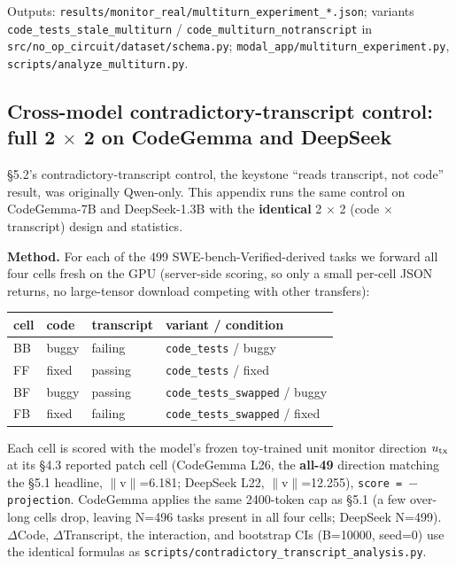 \documentclass[
  11pt,
  a4paper]{article}
\newcounter{none} %
\begin{document}
Outputs: \texttt{results/monitor\_real/multiturn\_experiment\_*.json};
variants \texttt{code\_tests\_stale\_multiturn} /
\texttt{code\_multiturn\_notranscript} in
\texttt{src/no\_op\_circuit/dataset/schema.py};
\texttt{modal\_app/multiturn\_experiment.py},
\texttt{scripts/analyze\_multiturn.py}.

\subsection{Cross-model contradictory-transcript control: full 2 \ensuremath{\times} 2 on
CodeGemma and
DeepSeek}\label{cross-model-contradictory-transcript-control-full-2-2-on-codegemma-and-deepseek}

\S{}5.2's contradictory-transcript control, the keystone ``reads
transcript, not code'' result, was originally Qwen-only. This appendix
runs the same control on CodeGemma-7B and DeepSeek-1.3B with the
\textbf{identical} 2 \ensuremath{\times} 2 (code \ensuremath{\times} transcript) design and statistics.

\textbf{Method.} For each of the 499 SWE-bench-Verified-derived tasks we
forward all four cells fresh on the GPU (server-side scoring, so only a
small per-cell JSON returns, no large-tensor download competing with
other transfers):

{\def\LTcaptype{none} %
\begin{longtable}[]{@{}llll@{}}
\toprule\noalign{}
cell & code & transcript & variant / condition \\
\midrule\noalign{}
\endhead
\bottomrule\noalign{}
\endlastfoot
BB & buggy & failing & \texttt{code\_tests} / buggy \\
FF & fixed & passing & \texttt{code\_tests} / fixed \\
BF & buggy & passing & \texttt{code\_tests\_swapped} / buggy \\
FB & fixed & failing & \texttt{code\_tests\_swapped} / fixed \\
\end{longtable}
}

Each cell is scored with the model's frozen toy-trained unit monitor
direction \(u_{\rm tx}\) at its \S{}4.3 reported patch cell (CodeGemma L26,
the \textbf{all-49} direction matching the \S{}5.1 headline, \ensuremath{\|}v\ensuremath{\|}=6.181;
DeepSeek L22, \ensuremath{\|}v\ensuremath{\|}=12.255), \texttt{score\ =\ \ensuremath{-}projection}. CodeGemma
applies the same 2400-token cap as \S{}5.1 (a few over-long cells drop,
leaving N=496 tasks present in all four cells; DeepSeek N=499). \ensuremath{\Delta}Code,
\ensuremath{\Delta}Transcript, the interaction, and bootstrap CIs (B=10000, seed=0) use
the identical formulas as
\texttt{scripts/contradictory\_transcript\_analysis.py}.
\end{document}
